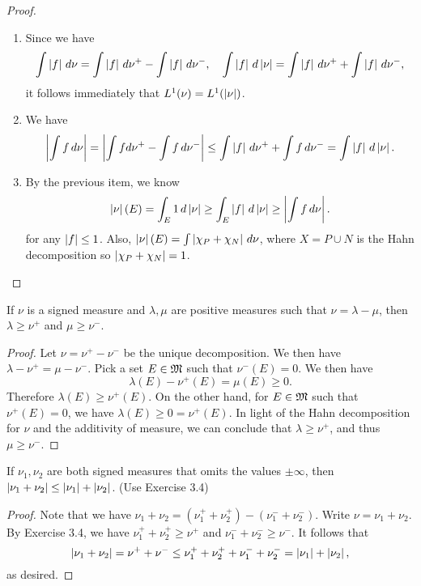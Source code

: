 \documentclass[a4paper]{article}
\begin{document}
\begin{proof}
\begin{enumerate}
\item Since we have 
\[
\int \left\lvert f\right\rvert \, d \nu = \int \left\lvert f\right\rvert \, d \nu^+ - \int \left\lvert f\right\rvert \, d \nu^-, 
\quad 
\int \left\lvert f\right\rvert \, d \left\lvert \nu\right\rvert = \int \left\lvert f\right\rvert \, d \nu^+ + \int \left\lvert f\right\rvert 
\, d \nu^-,
\]
it follows immediately that $L^1 (\nu) = L^1 (\left\lvert \nu\right\rvert)$.

\item We have 
\[
\begin{aligned}
\left\lvert \int f \, d \nu\right\rvert = \left\lvert \int f d \nu^+ - \int f \, d \nu^-\right\rvert 
\leq \int \left\lvert f\right\rvert \, d \nu^+ + \int f \, d \nu^- 
= \int \left\lvert f\right\rvert \, d \left\lvert \nu\right\rvert.
\end{aligned}
\]

\item By the previous item, we know
\[
\left\lvert \nu\right\rvert (E) = \int_E 1 \, d \left\lvert \nu\right\rvert \geq \int_E \left\lvert f\right\rvert 
\, d \left\lvert \nu\right\rvert \geq \left\lvert \int f \, d \nu\right\rvert.
\]
for any $\left\lvert f\right\rvert \leq 1$. Also, $\left\lvert \nu\right\rvert(E) = 
\int \left\lvert \chi_P + \chi_N\right\rvert \, d \nu$, where $X = P \cup N$ is the 
Hahn decomposition so $\left\lvert \chi_P + \chi_N\right\rvert = 1$.
\end{enumerate}
\end{proof}

\begin{ex}[Folland 3.4]
If $\nu$ is a signed measure and $\lambda, \mu$ are positive
measures such that $\nu = \lambda - \mu$, then $\lambda \geq \nu^+$
and $\mu \geq \nu^-$.
\end{ex}

\begin{proof}
Let $\nu = \nu^+ - \nu^-$ be the unique decomposition. 
We then have $\lambda - \nu^+ = \mu - \nu^-$. Pick a set $E \in \mathfrak{M}$
such that $\nu^- (E) = 0$. We then have 
\[
\lambda (E) - \nu^+ (E) = \mu (E) \geq 0.
\]
Therefore $\lambda (E) \geq \nu^+ (E)$. On the other hand,
for $E \in \mathfrak{M}$ such that $\nu^+ (E) = 0$, we have 
$\lambda (E) \geq 0 = \nu^+ (E)$. In light of the Hahn 
decomposition for $\nu$ and the additivity of measure, 
we can conclude that $\lambda \geq \nu^+$, and thus
$\mu \geq \nu^-$.
\end{proof}

\begin{ex}[Folland 3.5]
If $\nu_1, \nu_2$ are both signed measures that omits the values 
$\pm \infty$, then $\left\lvert \nu_1 + \nu_2\right\rvert \leq \left\lvert \nu_1\right\rvert + \left\lvert \nu_2\right\rvert$.
(Use Exercise 3.4)
\end{ex}

\begin{proof}
Note that we have $\nu_1 + \nu_2 = (\nu_1^+ +  \nu_2^+)
- (\nu_1^- + \nu_2^-)$. Write $\nu = \nu_1 + \nu_2$. 
By Exercise 3.4, we have 
$\nu_1^+ + \nu_2^+ \geq \nu^+$ and $\nu_1^- + \nu_2^- 
\geq \nu^-$. It follows that 
\[
\left\lvert \nu_1 + \nu_2\right\rvert = \nu^+ + \nu^- 
\leq \nu_1^+ + \nu_2^+ + \nu_1^- + \nu_2^- 
= \left\lvert \nu_1\right\rvert + \left\lvert \nu_2\right\rvert,
\]
as desired.
\end{proof}
\end{document}
